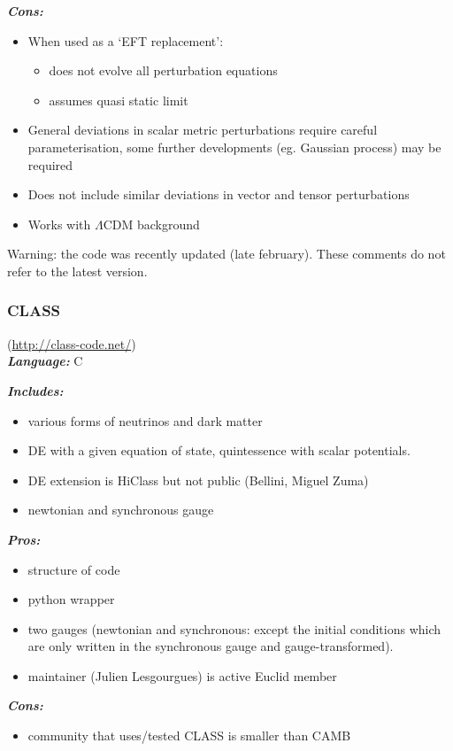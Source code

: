 {\it \bf Cons: }
\begin{itemize}
 \item When used as a ‘EFT replacement’:
 \begin{itemize}
  \item does not evolve all perturbation equations 
  \item assumes quasi static limit
 \end{itemize}
 \item General deviations in scalar metric perturbations require careful parameterisation, some further developments (eg. Gaussian process) may be required
 \item Does not include similar deviations in vector and tensor perturbations
 \item Works with $\Lambda$CDM background
\end{itemize}
Warning: the code was recently updated (late february). These comments do not refer to the latest version.\\

\newpage
\subsubsection{CLASS}(\url{http://class-code.net/})\\

{\it \bf  Language:} C

{\it \bf Includes:}
\begin{itemize}
 \item various forms of neutrinos and dark matter
 \item DE with a given equation of state, quintessence with scalar potentials.
 \item DE extension is HiClass but not public (Bellini, Miguel Zuma)
 \item newtonian and synchronous gauge
\end{itemize}

{\it \bf Pros: }
\begin{itemize}
 \item structure of code
 \item python wrapper
 \item two gauges (newtonian and synchronous: except the initial conditions which are only written in the synchronous gauge and gauge-transformed). 
 \item maintainer (Julien Lesgourgues) is active Euclid member
\end{itemize}

{\it \bf Cons: }
\begin{itemize}
 \item community that uses/tested CLASS is smaller than CAMB
\end{itemize}


